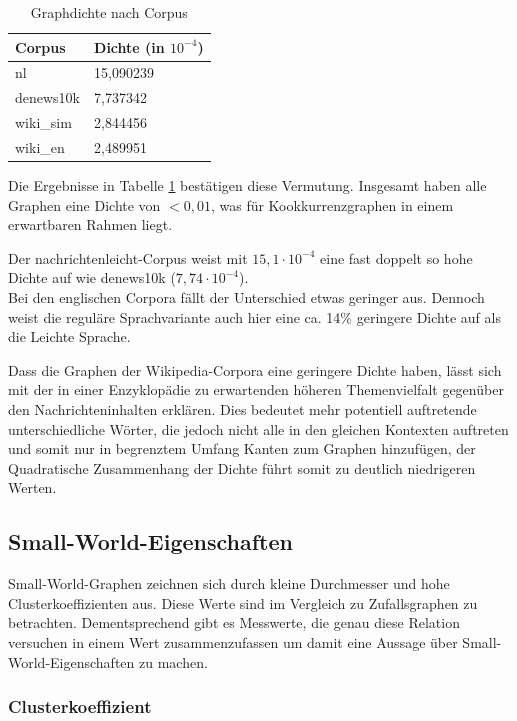 \documentclass[11pt, a4paper]{article}
\begin{document}
\begin{table}[ht]
  \centering
  \begin{tabular}{ll}
    \toprule
    Corpus            &         Dichte (in $10^{-4}$)\\
    \midrule
    nl                &  		15,090239 \\
    denews10k         &  		7,737342 \\
    wiki\_sim         &  		2,844456 \\
    wiki\_en          &  		2,489951 \\
    \bottomrule
  \end{tabular}
  \caption{\label{density_table} Graphdichte nach Corpus}
\end{table}

Die Ergebnisse in Tabelle \ref{density_table} bestätigen diese Vermutung.
Insgesamt haben alle Graphen eine Dichte von $<0,01$, was für
Kookkurrenzgraphen in einem erwartbaren Rahmen liegt.

Der nachrichtenleicht-Corpus weist mit $15,1\cdot 10^{-4}$ eine fast doppelt so
hohe Dichte auf wie denews10k ($7,74\cdot 10^{-4}$).\\
Bei den englischen Corpora fällt der Unterschied etwas geringer aus.
Dennoch weist die reguläre Sprachvariante auch hier eine ca. 14\% geringere
Dichte auf als die Leichte Sprache.

Dass die Graphen der Wikipedia-Corpora eine geringere Dichte haben, lässt sich
mit der in einer Enzyklopädie zu erwartenden höheren Themenvielfalt gegenüber
den Nachrichteninhalten erklären.
Dies bedeutet mehr potentiell auftretende unterschiedliche Wörter, die jedoch
nicht alle in den gleichen Kontexten auftreten und somit nur in begrenztem
Umfang Kanten zum Graphen hinzufügen, der Quadratische Zusammenhang der Dichte
führt somit zu deutlich niedrigeren Werten. 


\subsection{Small-World-Eigenschaften}
Small-World-Graphen zeichnen sich durch kleine Durchmesser und hohe Clusterkoeffizienten aus. Diese Werte sind im Vergleich zu Zufallsgraphen zu betrachten. Dementsprechend gibt es Messwerte, die genau diese Relation versuchen in einem Wert zusammenzufassen um damit eine Aussage über Small-World-Eigenschaften zu machen. 


\subsubsection{Clusterkoeffizient}
\end{document}
